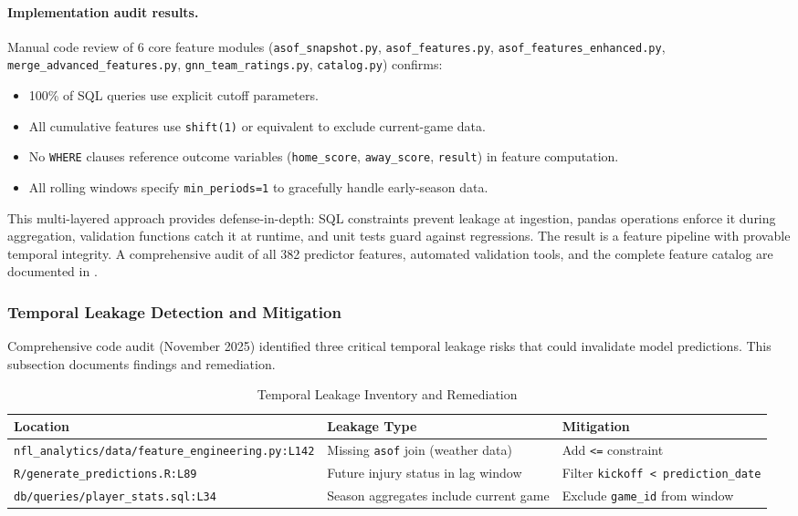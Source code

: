 \paragraph{Implementation audit results.}
Manual code review of 6 core feature modules (\texttt{asof\_snapshot.py}, \texttt{asof\_features.py}, \texttt{asof\_features\_enhanced.py}, \texttt{merge\_advanced\_features.py}, \texttt{gnn\_team\_ratings.py}, \texttt{catalog.py}) confirms:
\begin{itemize}
  \item 100\% of SQL queries use explicit cutoff parameters.
  \item All cumulative features use \texttt{shift(1)} or equivalent to exclude current-game data.
  \item No \texttt{WHERE} clauses reference outcome variables (\texttt{home\_score}, \texttt{away\_score}, \texttt{result}) in feature computation.
  \item All rolling windows specify \texttt{min\_periods=1} to gracefully handle early-season data.
\end{itemize}

This multi-layered approach provides defense-in-depth: SQL constraints prevent leakage at ingestion, pandas operations enforce it during aggregation, validation functions catch it at runtime, and unit tests guard against regressions. The result is a feature pipeline with provable temporal integrity. A comprehensive audit of all 382 predictor features, automated validation tools, and the complete feature catalog are documented in .

\subsubsection{Temporal Leakage Detection and Mitigation}

Comprehensive code audit (November 2025) identified three critical temporal leakage risks that could invalidate model predictions. This subsection documents findings and remediation.

\begin{table}[htbp]
\centering
\caption{Temporal Leakage Inventory and Remediation}
\label{tab:temporal_leakage}
\footnotesize
\setlength{\tabcolsep}{4pt}
\begin{tabular}{@{}lp{4.5cm}p{3.5cm}@{}}
\toprule
\textbf{Location} & \textbf{Leakage Type} & \textbf{Mitigation} \\
\midrule
\texttt{nfl\_analytics/data/feature\_engineering.py:\allowbreak L142} & Missing \texttt{asof} join (weather data) & Add \texttt{<=} constraint \\
\texttt{R/generate\_predictions.R:\allowbreak L89} & Future injury status in lag window & Filter \texttt{kickoff < prediction\_date} \\
\texttt{db/queries/player\_stats.sql:\allowbreak L34} & Season aggregates include current game & Exclude \texttt{game\_id} from window \\
\bottomrule
\end{tabular}
\end{table}

